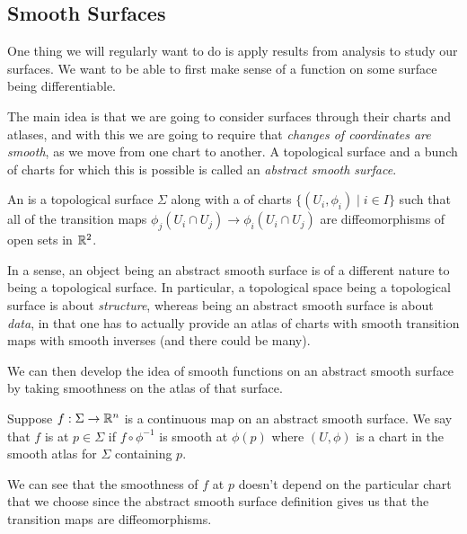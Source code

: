 \documentclass[a4paper]{article}
\begin{document}
\begin{center}
\begin{tikzpicture}[x=0.75pt,y=0.75pt,yscale=-1,xscale=1]
\end{tikzpicture}

\end{center}

\subsection{Smooth Surfaces}

One thing we will regularly want to do is apply results from analysis to study our surfaces. We want to be able to first make sense of a function on some surface being differentiable.

The main idea is that we are going to consider surfaces through their charts and atlases, and with this we are going to require that \emph{changes of coordinates are smooth}, as we move from one chart to another.
A topological surface and a bunch of charts for which this is possible is called an \emph{abstract smooth surface}.

\begin{definition}
    An  is a topological surface $\Sigma$ along with a  of charts $\{(U_i, \phi_i) \mid i \in I\}$ such that all of the transition maps $\phi_j(U_i \cap U_j) \rightarrow \phi_i(U_i \cap U_j)$ are diffeomorphisms of open sets in $\R^2$.
\end{definition}

In a sense, an object being an abstract smooth surface is of a different nature to being a topological surface. In particular, a topological space being a topological surface is about \emph{structure}, whereas being an abstract smooth surface is about \emph{data}, in that one has to actually provide an atlas of charts with smooth transition maps with smooth inverses (and there could be many). 

We can then develop the idea of smooth functions on an abstract smooth surface by taking smoothness on the atlas of that surface.

\begin{definition}
    Suppose $f: \Sigma \rightarrow \R^n$ is a continuous map on an abstract smooth surface. We say that $f$ is  at $p \in \Sigma$ if $f \circ \phi^{-1}$ is smooth at $\phi(p)$ where $(U, \phi)$ is a chart in the smooth atlas for $\Sigma$ containing $p$.
\end{definition}

We can see that the smoothness of $f$ at $p$ doesn't depend on the particular chart that we choose since the abstract smooth surface definition gives us that the transition maps are diffeomorphisms.
\end{document}
